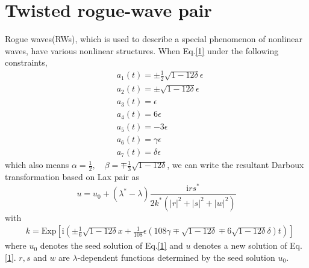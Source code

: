 \documentclass[12pt]{article}
\begin{document}
\section{Twisted rogue-wave pair}
Rogue waves(RWs), which is used to describe a special phenomenon of nonlinear waves, have various nonlinear structures\cite{1,2,11,12,13}. When Eq.\eqref{1} under the following constraints,
\begin{align}
  & a_{1}(t) = \pm\frac{1}{2}\sqrt{1-12\delta}\epsilon \\
  & a_{2}(t) = \pm\sqrt{1-12\delta}\epsilon \\
  & a_{3}(t) = \epsilon \\
  & a_{4}(t) = 6\epsilon \\
  & a_{5}(t) = -3\epsilon \\
  & a_{6}(t) = \gamma \epsilon \\
  & a_{7}(t) = \delta \epsilon
\end{align}
which also means $\alpha = \frac{1}{2}, \quad \beta=\mp \frac{1}{3}\sqrt{1-12\delta}$, we can write the resultant Darboux transformation based on Lax pair as
\begin{equation}\label{56}
  u = u_{0} + (\lambda^{*}-\lambda)\frac{\mathrm{i}rs^{*}}{2k^{*}(|r|^{2}+|s|^{2}+|w|^{2})}
\end{equation}
with
\begin{align}
  & k=\mathrm{Exp}\left[\mathrm{i}\left(\pm \frac{1}{6}\sqrt{1-12\delta}x + \frac{1}{108}\epsilon(108\gamma \mp \sqrt{1-12\delta} \mp 6\sqrt{1-12\delta}\delta)t\right)\right]
\end{align}
where $u_{0}$ denotes the seed solution of Eq.\eqref{1} and $u$ denotes a new solution of Eq.\eqref{1}. $r, s$ and $w$ are $\lambda$-dependent functions determined by the seed solution $u_{0}$.
\end{document}

